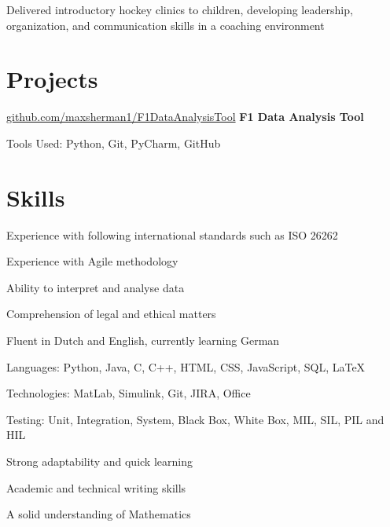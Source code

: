 	\vspace{0.10 cm}
	\begin{onecolentry}
		\begin{highlights}
			\item Delivered introductory hockey clinics to children, developing leadership, organization, and communication skills in a coaching environment
		\end{highlights}
	\end{onecolentry}
	
	\section{Projects}
	
	
	\begin{splitcolentry}{
			\href{https://github.com/maxsherman1/F1DataAnalysisTool}{github.com/maxsherman1/F1DataAnalysisTool}
		}
		\textbf{F1 Data Analysis Tool}
	\end{splitcolentry}
	
	\vspace{0.10 cm}
	\begin{onecolentry}
		\begin{highlights}
			\item 
			\item Tools Used: Python, Git, PyCharm, GitHub
		\end{highlights}
	\end{onecolentry}
	
	\section{Skills}
	
	\begin{splitcolentry}{
			\begin{highlights}
				\item Experience with following international standards such as ISO 26262
				\item Experience with Agile methodology 
				\item Ability to interpret and analyse data
				\item Comprehension of legal and ethical matters
				\item Fluent in Dutch and English, currently learning German
			\end{highlights}
		}
		\begin{highlights}
			\item Languages: Python, Java, C, C++, HTML, CSS, JavaScript, SQL, LaTeX
			\item Technologies: MatLab, Simulink, Git, JIRA, Office
			\item Testing: Unit, Integration, System, Black Box, White Box, MIL, SIL, PIL and HIL
			\item Strong adaptability and quick learning
			\item Academic and technical writing skills
			\item A solid understanding of Mathematics
		\end{highlights}
	\end{splitcolentry}
	
